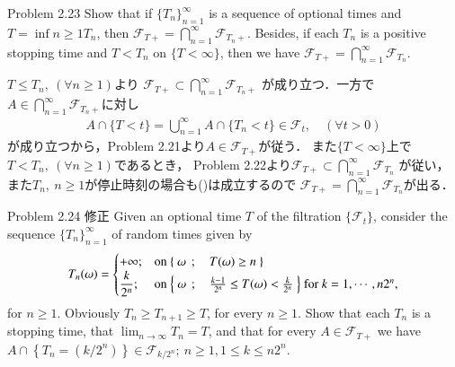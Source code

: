	\begin{itembox}[l]{Problem 2.23}
		Show that if $\{T_n\}_{n=1}^\infty$ is a sequence of optional times
		and $T = \inf{n \geq 1}{T_n}$, then $\mathscr{F}_{T+} = \bigcap_{n=1}^\infty \mathscr{F}_{T_n+}$.
		Besides, if each $T_n$ is a positive stopping time and $T < T_n$ on
		$\{T < \infty\}$, then we have $\mathscr{F}_{T+} = \bigcap_{n=1}^\infty \mathscr{F}_{T_n}$.
	\end{itembox}
	
	\begin{prf}
		$T \leq T_n,\ (\forall n \geq 1)$より
		$\mathscr{F}_{T+} \subset \bigcap_{n=1}^\infty \mathscr{F}_{T_n+}$
		が成り立つ．一方で$A \in \bigcap_{n=1}^\infty \mathscr{F}_{T_n+}$に対し
		\begin{align}
			A \cap \{T < t\}
			= \bigcup_{n=1}^\infty A \cap \{T_n < t\}
			\in \mathscr{F}_t,
			\quad (\forall t > 0)
			\label{eq:chapter_1_problem_2_23}
		\end{align}
		が成り立つから，Problem 2.21より$A \in \mathscr{F}_{T+}$が従う．
		また$\{T < \infty\}$上で$T < T_n,\ (\forall n \geq 1)$であるとき，
		Problem 2.22より$\mathscr{F}_{T+} \subset \bigcap_{n=1}^\infty \mathscr{F}_{T_n}$
		が従い，また$T_n,\ n \geq 1$が停止時刻の場合も()は成立するので
		$\mathscr{F}_{T+} = \bigcap_{n=1}^\infty \mathscr{F}_{T_n}$が出る．
		\QED
	\end{prf}
	
	\begin{itembox}[l]{Problem 2.24 修正}\label{chapter_1_Problem_2_24}
		Given an optional time $T$ of the filtration $\{\mathscr{F}_t\}$,
		consider the sequence $\{T_n\}_{n=1}^\infty$ of random times given by
		\begin{align}
			T_n(\omega) = 
			\begin{cases}
				+\infty; & \mbox{on $\left\{\ \omega\ \, ; \quad T(\omega) \geq n\ \right\}$} \\
				\displaystyle\frac{k}{2^n}; & \mbox{on $\left\{\ \omega\ \, ; \quad \frac{k-1}{2^n} \leq T(\omega) < \frac{k}{2^n}\ \right\}$ for $k=1,\cdots,n2^n$},
			\end{cases}
		\end{align}
		for $n \geq 1$. Obviously $T_n \geq T_{n+1} \geq T$,
		for every $n \geq 1$. Show that each $T_n$ is a stopping time,
		that $\lim_{n \to \infty} T_n = T$, and that for every $A \in \mathscr{F}_{T+}$
		we have $A \cap \left\{ T_n = (k/2^n) \right\} \in \mathscr{F}_{k/2^n};\ n \geq 1, 1 \leq k \leq n2^n$.
	\end{itembox}
	
